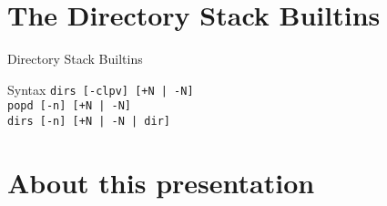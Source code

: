 \documentclass[10pt, compress, aspectratio=169]{beamer}
\begin{document}
\section{The Directory Stack Builtins}
\begin{frame}{Directory Stack Builtins}
	\begin{alertblock}{Syntax}
		\texttt{dirs [-clpv] [+N | -N] } \\
		\texttt{popd [-n] [+N | -N] } \\
		\texttt{dirs [-n] [+N | -N | dir] }
	\end{alertblock}
\end{frame}

\section{About this presentation}
\begin{frame}[standout]
   \begin{center}\ccbysa\end{center}
\end{frame}

\maketitle
\end{document}
